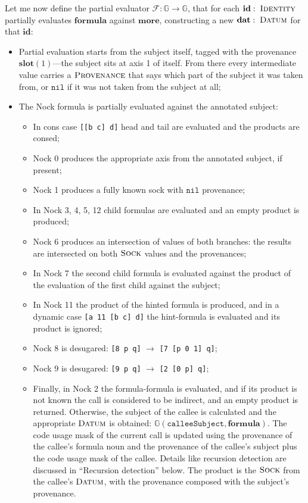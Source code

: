 \documentclass[twoside]{article}
\begin{document}
Let me now define the partial evaluator $\mathcal{F}: \mathbb{G} \rightarrow \mathbb{G}$, that for each $\mathbf{id}:\;\textsc{Identity}$ partially evaluates $\mathbf{formula}$ against $\mathbf{more}$, constructing a new $\mathbf{dat}:\;\textsc{Datum}$ for that $\mathbf{id}$:
\begin{itemize}
  \item  Partial evaluation starts from the subject itself, tagged with the provenance $\mathbf{slot}(1)$---the subject sits at axis 1 of itself. From there every intermediate value carries a $\textsc{Provenance}$ that says which part of the subject it was taken from, or $\mathtt{nil}$ if it was not taken from the subject at all;
  \item The Nock formula is partially evaluated against the annotated subject:
    \begin{itemize}
      \item  In cons case \lstinline[style=inlinecode]{[[b c] d]} head and tail are evaluated and the products are consed;
      \item  Nock 0 produces the appropriate axis from the annotated subject, if present;
      \item  Nock 1 produces a fully known sock with $\mathtt{nil}$ provenance;
      \item  In Nock 3, 4, 5, 12 child formulas are evaluated and an empty product is produced;
      \item Nock 6 produces an intersection of values of both branches: the results are intersected on both $\textsc{Sock}$ values and the provenances;
      \item In Nock 7 the second child formula is evaluated against the product of the evaluation of the first child against the subject;
      \item In Nock 11 the product of the hinted formula is produced, and in a dynamic case \lstinline[style=inlinecode]{[a 11 [b c] d]} the hint-formula is evaluated and its product is ignored;
      \item Nock 8 is desugared: \lstinline[style=inlinecode]{[8 p q]} $\rightarrow$ \lstinline[style=inlinecode]{[7 [p 0 1] q]};
      \item Nock 9 is desugared: \lstinline[style=inlinecode]{[9 p q]} $\rightarrow$ \lstinline[style=inlinecode]{[2 [0 p] q]};
      \item Finally, in Nock 2 the formula-formula is evaluated, and if its product is not known the call is considered to be indirect, and an empty product is returned. Otherwise, the subject of the callee is calculated and the appropriate $\textsc{Datum}$ is obtained: $\mathbb{G}(\mathtt{calleeSubject}, \mathbf{formula})$. The code usage mask of the current call is updated using the provenance of the callee's formula noun and the provenance of the callee's subject plus the code usage mask of the callee. Details like recursion detection are discussed in ``Recursion detection'' below. The product is the $\textsc{Sock}$ from the callee's $\textsc{Datum}$, with the provenance composed with the subject's provenance.
    \end{itemize}
\end{itemize}
\end{document}
